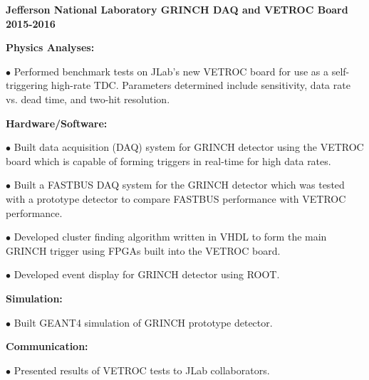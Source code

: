 \documentclass[letterpaper,10pt]{article}
\renewenvironment{itemize}{
  \begin{list}{}{
    \setlength{\leftmargin}{1.5em}
  }
}{
  \end{list}
}
\begin{document}
{\begin{itemize}
 \vspace{3mm}
 
\item {\large {\bf Jefferson National Laboratory GRINCH DAQ and VETROC Board 2015-2016} }

 \begin{itemize}\itemsep5pt \parskip0pt 
  \item \textbf{Physics Analyses:}
    \begin{itemize}\itemsep5pt \parskip0pt 
     \item $\bullet$ Performed benchmark tests on JLab's new VETROC board for use as a self-triggering high-rate TDC. Parameters determined include sensitivity, data rate vs. dead time, and two-hit resolution.
     \end{itemize}

  \item \textbf{Hardware/Software:}
    \begin{itemize}\itemsep5pt \parskip0pt 
     \item $\bullet$ Built data acquisition (DAQ) system for GRINCH detector using the VETROC board which is capable of forming triggers in real-time for high data rates. 
     \item $\bullet$ Built a FASTBUS DAQ system for the GRINCH detector which was tested with a prototype detector to compare FASTBUS performance with VETROC performance.
     \item $\bullet$ Developed cluster finding algorithm written in VHDL to form the main GRINCH trigger using FPGAs built into the VETROC board.
     \item $\bullet$ Developed event display for GRINCH detector using ROOT. 
    \end{itemize}
    
   \item \textbf{Simulation:}
     \begin{itemize}\itemsep5pt \parskip0pt 
      \item $\bullet$ Built GEANT4 simulation of GRINCH prototype detector.
     \end{itemize} 
     
   \item \textbf{Communication:}
	\begin{itemize}\itemsep5pt
		\item $\bullet$ Presented results of VETROC tests to JLab collaborators.
	\end{itemize}
 \end{itemize}


\end{itemize}}
\end{document}

